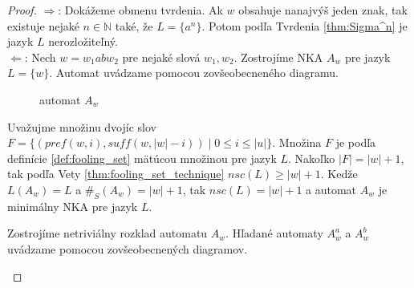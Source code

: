 \begin{proof}
$ \Rightarrow $: Dokážeme obmenu tvrdenia. Ak $ w $ obsahuje nanajvýš jeden znak, tak existuje nejaké $ n \in \mathbb{N} $ také, že $ L = \lbrace a^n \rbrace $. Potom podľa Tvrdenia \ref{thm:Sigma^n} je jazyk $ L $ nerozložiteľný. \\
$ \Leftarrow $: Nech $ w = w_1abw_2 $ pre nejaké slová $ w_1,w_2 $. Zostrojíme NKA $ A_w $ pre jazyk $ L = \lbrace w \rbrace $. Automat uvádzame pomocou zovšeobecneného diagramu.

\begin{figure}[H]
\centering
{}
\caption{automat $ A_w $}
\end{figure}

Uvažujme množinu dvojíc slov $ F = \lbrace (pref(w,i),suff(w,|w|-i)) \; | \; 0 \leq i \leq |u| \rbrace $. Množina $ F $ je podľa definície \ref{def:fooling_set} mätúcou množinou pre jazyk $ L $. Nakoľko $ |F| = |w|+1 $, tak podľa Vety \ref{thm:fooling_set_technique} $ nsc(L) \geq |w|+1 $. Kedže $ L(A_w) = L $ a $ \#_S(A_w) = |w|+1 $, tak $ nsc(L) = |w|+1 $ a automat $ A_w $ je minimálny NKA pre jazyk $ L $.
\par
Zostrojíme netriviálny rozklad automatu $ A_w $. Hľadané automaty $ A^a_w $ a $ A^b_w $ uvádzame pomocou zovšeobecnených diagramov.

\begin{figure}[H]
\centering
{}


\end{figure}
\end{proof}
